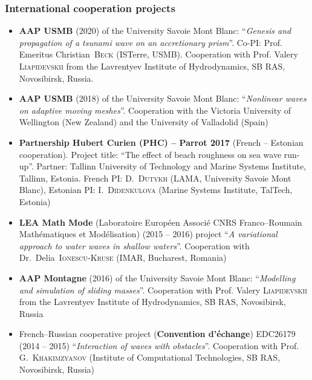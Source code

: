 \documentclass[final, a4paper, oneside, 12pt]{article}
\numberwithin{equation}{section}
\begin{document}
\subsubsection{International cooperation projects}

\begin{itemize}

  \item \textbf{AAP USMB} (2020) of the University Savoie Mont Blanc: ``\textit{Genesis and propagation of a tsunami wave on an accretionary prism}''. Co-PI: Prof. Emeritus Christian~\textsc{Beck} (ISTerre, USMB). Cooperation with Prof. Valery \textsc{Liapidevskii} from the Lavrentyev Institute of Hydrodynamics, SB RAS, Novosibirsk, Russia.

  \item \textbf{AAP USMB} (2018) of the University Savoie Mont Blanc: ``\textit{Nonlinear waves on adaptive moving meshes}''. Cooperation with the Victoria University of Wellington (New Zealand) and the University of Valladolid (Spain)

  \item \textbf{Partnership Hubert Curien (PHC) -- Parrot 2017} (French -- Estonian cooperation). Project title: ``The effect of beach roughness on sea wave run-up''. Partner: Tallinn University of Technology and Marine Systems Institute, Tallinn, Estonia. French PI: D.~\textsc{Dutykh} (LAMA, University Savoie Mont Blanc), Estonian PI: I.~\textsc{Didenkulova} (Marine Systems Institute, TalTech, Estonia)

  \item \textbf{LEA Math Mode} (Laboratoire Europ\'een Associ\'e CNRS Franco--Roumain Math\'e\-matiques et Mod\'elisation) (2015 -- 2016) project ``\textit{A variational approach to water waves in shallow waters}''. Cooperation with Dr.~Delia~\textsc{Ionescu-Kruse} (IMAR, Bucharest, Romania)
  
  \item \textbf{AAP Montagne} (2016) of the University Savoie Mont Blanc: ``\textit{Modelling and simulation of sliding masses}''. Cooperation with Prof. Valery \textsc{Liapidevskii} from the Lavrentyev Institute of Hydrodynamics, SB RAS, Novosibirsk, Russia
  
  \item French--Russian cooperative project (\textbf{Convention d'\'echange}) \No EDC26179 (2014 -- 2015) ``\textit{Interaction of waves with obstacles}''. Cooperation with Prof. G.~\textsc{Khakimzyanov} (Institute of Computational Technologies, SB RAS, Novosibirsk, Russia)
	

\end{itemize}
\end{document}
